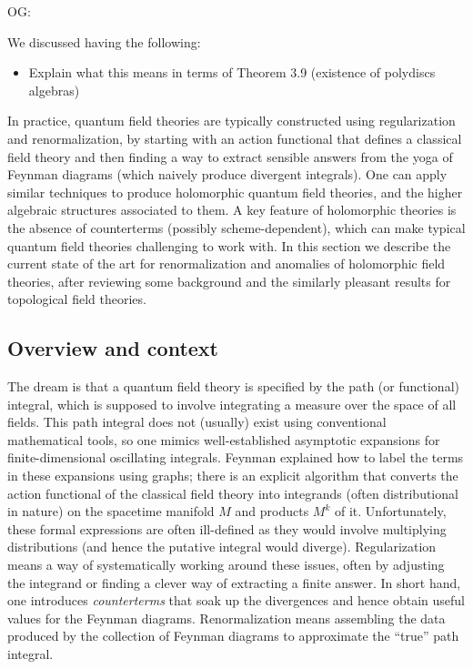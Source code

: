 \documentclass[11pt]{amsart}
\def\owen#1{{\textcolor{violet!50!black}{OG: {#1}}}}
\begin{document}
\owen{We discussed having the following:
\begin{itemize}
\item Explain what this means in terms of Theorem 3.9 (existence of polydiscs algebras)
\end{itemize}}

In practice, quantum field theories are typically constructed using regularization and renormalization,
by starting with an action functional that defines a classical field theory and then finding a way to extract sensible answers from the yoga of Feynman diagrams (which naively produce divergent integrals).
One can apply similar techniques to produce holomorphic quantum field theories, and the higher algebraic structures associated to them.
A key feature of holomorphic theories is the absence of counterterms (possibly scheme-dependent), 
which can make typical quantum field theories challenging to work with.
In this section we describe the current state of the art for renormalization and anomalies of holomorphic field theories,
after reviewing some background and the similarly pleasant results for topological field theories.

\subsection{Overview and context}

The dream is that a quantum field theory is specified by the path (or functional) integral,
which is supposed to involve integrating a measure over the space of all fields.
This path integral does not (usually) exist using conventional mathematical tools,
so one mimics well-established asymptotic expansions for finite-dimensional oscillating integrals.
Feynman explained how to label the terms in these expansions using graphs;
there is an explicit algorithm that converts the action functional of the classical field theory into integrands (often distributional in nature) on the spacetime manifold $M$ and products $M^k$ of it.
Unfortunately, these formal expressions are often ill-defined as they would involve multiplying distributions (and hence the putative integral would diverge).
Regularization means a way of systematically working around these issues,
often by adjusting the integrand or finding a clever way of extracting a finite answer.
In short hand, one introduces {\it counterterms} that soak up the divergences and hence obtain useful values for the Feynman diagrams.
Renormalization means assembling the data produced by the collection of Feynman diagrams to approximate the ``true'' path integral.
\end{document}
